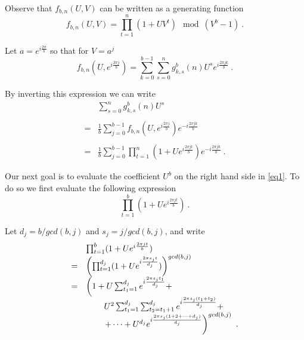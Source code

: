 \documentclass[12pt]{article} \pagestyle{plain} \topmargin
\begin{document}
Observe that $f_{b,n}(U,V)$ can be written as a generating
function
\begin{equation}\label{eq1a}
f_{b,n}(U,V)= \prod_{t=1}^n (1+UV^t) \mod (V^b-1)~.
\end{equation}


Let $a=e^{i\frac{2\pi }{b}}$ so that for $V=a^j$
\begin{equation}\label{eq1b}
f_{b,n}(U,e^{i\frac{2\pi j}{b}})= \sum_{k=0}^{b-1} \sum_{s=0}^n
g^b_{k,s}(n)U^s e^{i\frac{2\pi jk}{b}}~.
\end{equation}

By inverting this expression we can write
\begin{equation}\label{eq1}
\begin{array}{lll}
&\sum_{s=0}^n g^b_{k,s}(n)U^s \\ \\=& \frac{1}{b}
\sum_{j=0}^{b-1}f_{b,n}(U,e^{i\frac{2\pi j}{b}}) e^{-i\frac{2\pi
jk}{b}}\\ \\=& \frac{1}{b} \sum_{j=0}^{b-1} \prod_{t=1}^n
(1+Ue^{i\frac{2\pi jt}{b}}) e^{-i\frac{2\pi jk}{b}}~.
\end{array}
\end{equation}

Our next goal is to evaluate the coefficient $U^b$ on the right hand
side in \eqref{eq1}. To do so we first evaluate the following
expression
\begin{equation}
\prod_{t=1}^b (1+Ue^{i\frac{2\pi jt}{b}})~.
\end{equation}

Let $d_j=b/gcd(b,j)$ and $s_j=j/gcd(b,j)$, and write
\begin{equation}
\begin{array}{lll}
{}&\prod_{t=1}^b (1+Ue^{i\frac{2\pi jt}{b}})\\=&
\left(\prod_{t=1}^{d_j} (1+Ue^{i\frac{2\pi
s_j t}{d_j}})\right)^{gcd(b,j)}\\
=& \left( 1+ U\sum_{t_1=1}^{d_j} e^{i\frac{2\pi s_j t_1}{d_j}}+
\right.
\\{}&\hspace{0.3in}U^2\sum_{t_1=1}^{d_j}\sum_{t_2=t_1+1}^{d_j}
e^{i\frac{2\pi s_j(t_1+t_2)}{d_j}}
+\\{}&\left.\hspace{0.3in}+\dots + U^{d_j} e^{i\frac{2\pi s_j
(1+2+\dots+d_j)}{d_j}}\right)^{gcd(b,j)}~.
\end{array}
\end{equation}
\end{document}
